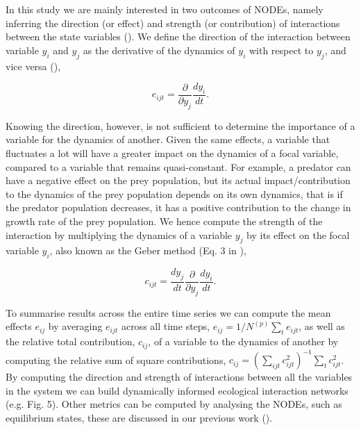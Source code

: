 \documentclass[11pt, oneside]{article}
\begin{document}
In this study we are mainly interested in two outcomes of NODEs, namely inferring the direction (or effect) and strength (or contribution) of interactions between the state variables (\cite{Bonnaffe2021a}).
We define the direction of the interaction between variable $y_i$ and $y_j$ as the derivative of the dynamics of $y_i$ with respect to $y_j$, and vice versa (\cite{Sugihara2012}), 

\vspace{-0.5cm}
\begin{equation}
    e_{ijt} = \frac{\partial}{\partial y_j} \frac{dy_i}{dt}.
\end{equation}

Knowing the direction, however, is not sufficient to determine the importance of a variable for the dynamics of another. 
Given the same effects, a variable that fluctuates a lot will have a greater impact on the dynamics of a focal variable, compared to a variable that remains quasi-constant.
For example, a predator can have a negative effect on the prey population, but its actual impact/contribution to the dynamics of the prey population depends on its own dynamics, that is if the predator population decreases, it has a positive contribution to the change in growth rate of the prey population. 
We hence compute the strength of the interaction by multiplying the dynamics of a variable $y_j$ by its effect on the focal variable $y_i$, also known as the Geber method (Eq. 3 in \cite{Hairston2005}),

\vspace{-0.5cm}
\begin{equation}
    c_{ijt} = \frac{dy_j}{dt} \frac{\partial}{\partial y_j} \frac{dy_i}{dt}.
\end{equation}

To summarise results across the entire time series we can compute the mean effects $e_{ij}$ by averaging $e_{ijt}$ across all time steps, $e_{ij} = 1/N^{(p)} \sum_t e_{ijt}$, as well as the relative total contribution, $c_{ij}$, of a variable to the dynamics of another by computing the relative sum of square contributions, $c_{ij} = \left( \sum_{ijt} c_{ijt}^{2} \right)^{-1} \sum_t c_{ijt}^2$. 
By computing the direction and strength of interactions between all the variables in the system we can build dynamically informed ecological interaction networks (e.g. Fig. 5).
Other metrics can be computed by analysing the NODEs, such as equilibrium states, these are discussed in our previous work (\cite{Bonnaffe2021a}). 

\end{document}
